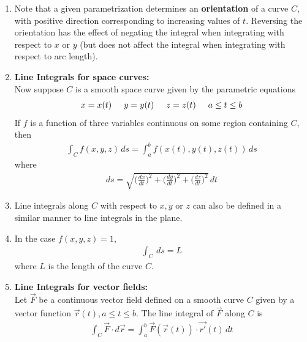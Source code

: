 \documentclass[10pt]{article}
\begin{document}
\begin{multicols}{2}
\begin{enumerate}
\begin{enumerate}
        \item Note that a given parametrization determines an \textbf{orientation} of a curve $C$, with positive direction corresponding to increasing values of $t$. Reversing the orientation has the effect of negating the integral when integrating with respect to $x$ or $y$ (but does not affect the integral when integrating with respect to arc length).
        
        \item \textbf{Line Integrals for space curves:} \\
        Now suppose $C$ is a smooth space curve given by the parametric equations
        \begin{align*}
            x=x(t) \hspace{5mm} y=y(t) \hspace{5mm} z = z(t) \hspace{5mm} a \leq t \leq b
        \end{align*}
        If $f$ is a function of three variables continuous on some region containing $C$, then
        \begin{align*}
            \int_C f(x,y,z) \,ds = \int_a^b f(x(t), y(t),z(t)) \,ds
        \end{align*}
        where 
        \begin{align*}
            ds = \sqrt{ \biggl(\frac{dx}{dt}\biggr)^{\!2} + \biggl(\frac{dy}{dt}\biggr)^{\!2} + 
            \biggl(\frac{dz}{dt}\biggr)^{\!2}} \, dt
        \end{align*}
        \item Line integrals along $C$ with respect to $x,y$ or $z$ can also be defined in a similar manner to line integrals in the plane. 
        \item In the case $f(x,y,z)=1$, 
        \begin{align*}
            \int_C  \,ds = L
        \end{align*}
        where $L$ is the length of the curve $C$.
        
        \item \textbf{Line Integrals for vector fields:} \\
        Let $\vec{F}$ be a continuous vector field defined on a smooth curve $C$ given by a vector function $\vec{r}(t), a \leq t \leq b$. The line integral of $\vec{F}$ along $C$ is
        \begin{align*}
            \int_C \vec{F} \cdot d\vec{r} = \int_a^b \vec{F}(\vec{r}(t)) \cdot \vec{r'}(t) \,dt
        \end{align*}
        

\end{enumerate}
\end{enumerate}
\end{multicols}
\end{document}
